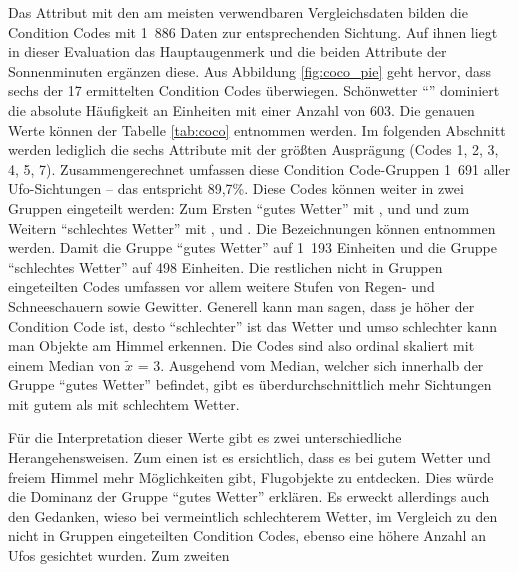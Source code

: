 Das Attribut mit den am meisten verwendbaren Vergleichsdaten bilden die Condition Codes mit 1~886 Daten zur entsprechenden Sichtung. Auf ihnen liegt in dieser Evaluation das Hauptaugenmerk und die beiden Attribute der Sonnenminuten ergänzen diese. Aus Abbildung \ref{fig:coco_pie} geht hervor, dass sechs der 17 ermittelten Condition Codes überwiegen. Schönwetter \enquote{} dominiert die absolute Häufigkeit an Einheiten mit einer Anzahl von 603. Die genauen Werte können der Tabelle \ref{tab:coco} entnommen werden. Im folgenden Abschnitt werden lediglich die sechs Attribute mit der größten Ausprägung (Codes 1, 2, 3, 4, 5, 7). Zusammengerechnet umfassen diese Condition Code-Gruppen 1~691 aller Ufo-Sichtungen -- das entspricht 89,7\%. Diese Codes können weiter in zwei Gruppen eingeteilt werden: Zum Ersten \enquote{gutes Wetter} mit ,  und  und zum Weitern \enquote{schlechtes Wetter} mit ,  und . Die Bezeichnungen können \cite{coco:2021} entnommen werden. Damit die Gruppe \enquote{gutes Wetter} auf 1~193 Einheiten und die Gruppe \enquote{schlechtes Wetter} auf 498 Einheiten. Die restlichen nicht in Gruppen eingeteilten Codes umfassen vor allem weitere Stufen von Regen- und Schneeschauern sowie Gewitter. Generell kann man sagen, dass je höher der Condition Code ist, desto \enquote{schlechter} ist das Wetter und umso schlechter kann man Objekte am Himmel erkennen. Die Codes sind also ordinal skaliert mit einem Median von $\tilde{x}$ = 3. Ausgehend vom Median, welcher sich innerhalb der Gruppe \enquote{gutes Wetter} befindet, gibt es überdurchschnittlich mehr Sichtungen mit gutem als mit schlechtem Wetter.

Für die Interpretation dieser Werte gibt es zwei unterschiedliche Herangehensweisen. Zum einen ist es ersichtlich, dass es bei gutem Wetter und freiem Himmel mehr Möglichkeiten gibt, Flugobjekte zu entdecken. Dies würde die Dominanz der Gruppe \enquote{gutes Wetter} erklären. Es erweckt allerdings auch den Gedanken, wieso bei vermeintlich schlechterem Wetter, im Vergleich zu den nicht in Gruppen eingeteilten Condition Codes, ebenso eine höhere Anzahl an Ufos gesichtet wurden. Zum zweiten


